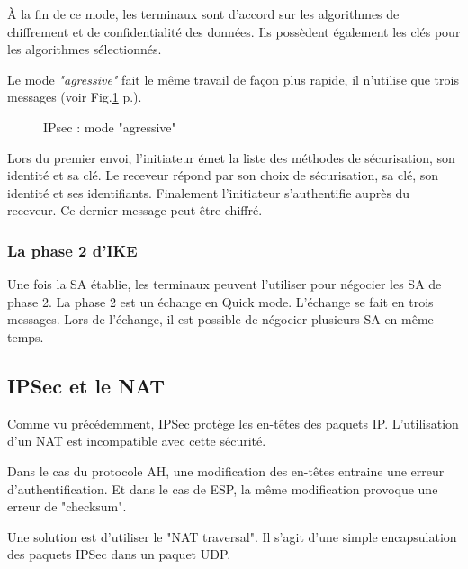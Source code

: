 À la fin de ce mode, les terminaux sont d'accord sur les algorithmes de chiffrement et de confidentialité des données. 
Ils possèdent également les clés pour les algorithmes sélectionnés. 

Le mode \textit{"agressive"} fait le même travail de façon plus rapide, il n'utilise que trois messages (voir Fig.\ref{fig:ipsagg} p.\pageref{fig:ipsagg}).
\begin{figure}[ht]
\centering
{}
\caption{IPsec : mode "agressive"}
\label{fig:ipsagg}
\end{figure} 
Lors du premier envoi, l'initiateur émet la liste des méthodes de sécurisation, son identité et sa clé. 
Le receveur répond par son choix de sécurisation, sa clé, son identité et ses identifiants. 
Finalement l'initiateur s'authentifie auprès du receveur. 
Ce dernier message peut être chiffré.
\subsubsection{La phase 2 d'IKE}
Une fois la SA établie, les terminaux peuvent l'utiliser pour négocier les SA de phase 2. 
La phase 2 est un échange en Quick mode. 
L'échange se fait en trois messages. 
Lors de l'échange, il est possible de négocier plusieurs SA en même temps. 

\subsection{IPSec et le NAT}
Comme vu précédemment, IPSec protège les en-têtes des paquets IP. 
L'utilisation d'un NAT est incompatible avec cette sécurité.

Dans le cas du protocole AH, une modification des en-têtes entraine une erreur d'authentification. 
Et dans le cas de ESP, la même modification provoque une erreur de "checksum".

Une solution est d'utiliser le "NAT traversal".
Il s'agit d'une simple encapsulation des paquets IPSec dans un paquet UDP.
